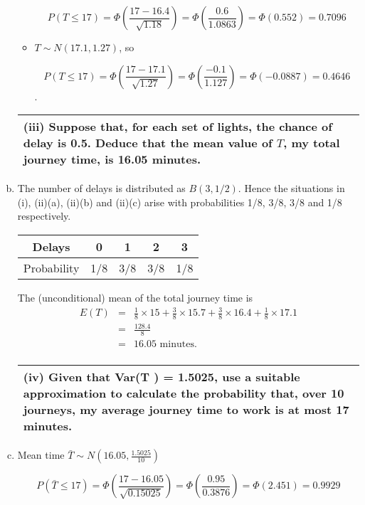 \documentclass[a4paper,12pt]{article}
\begin{document}
\begin{enumerate}[(a)]
\begin{itemize}
\[P(T \leq 17) = \Phi \left(\frac{17 - 16.4}{\sqrt{1.18}} \right) = \Phi \left(\frac{0.6}{1.0863}\right) = \Phi(0.552) = 0.7096\]

\item $T \sim N(17.1, 1.27)$, so

\[P(T \leq 17) = \Phi \left(\frac{17 - 17.1}{\sqrt{1.27}} \right) = \Phi \left( \frac{-0.1}{1.127}\right) = \Phi(-0.0887) = 0.4646\]
.
\end{itemize}

\newpage


\begin{table}[ht!]
     \centering
     \begin{tabular}{|p{15cm}|}
     \hline        
\noindent (iii) Suppose that, for each set of lights, the chance of delay is 0.5. Deduce that the mean value of 
$T$, my total journey time, is 16.05 minutes.


\\ \hline
      \end{tabular}
    \end{table}
 \item The number of delays is distributed as $B(3, 1/2)$. Hence the situations in (i), (ii)(a), (ii)(b) and (ii)(c) arise with probabilities 1/8, 3/8, 3/8 and 1/8 respectively.
 
\begin{center} 
\begin{tabular}{|c|c|c|c|c|} \hline
Delays  & 0 & 1 & 2 & 3 \\ \hline
Probability &  1/8 & 3/8 & 3/8 & 1/8  \\ \hline
\end{tabular}
\end{center}

The (unconditional) mean of the total journey time is
\begin{eqnarray*}
E(T) &=& \frac{1}{8} \times 15 + \frac{3}{8} \times 15.7 + \frac{3}{8} \times 16.4  + \frac{1}{8} \times 17.1\\
&=& \frac{128.4}{8} \\
&=& 16.05 \mbox{ minutes.}\\
\end{eqnarray*}
\newpage
    \begin{table}[ht!]
     \centering
     \begin{tabular}{|p{15cm}|}
     \hline        
\noindent (iv) Given that Var(T ) = 1.5025, use a suitable approximation to calculate the probability that, over 10 journeys, my average journey time to work is at most 17 minutes.
\\ \hline
      \end{tabular}
    \end{table}


\item Mean time $\bar{T} \sim N(16.05,\frac{1.5025}{10})$ 

\[P(\bar{T} \leq 17) = \Phi \left(\frac{17 - 16.05}{\sqrt{0.15025}} \right) = \Phi \left(\frac{0.95}{0.3876}\right) = \Phi(2.451) = 0.9929\]
\end{enumerate}
\end{document}

